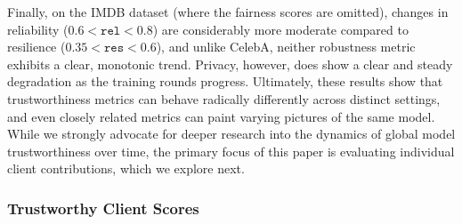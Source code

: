 \documentclass[acmsmall]{acmart}
\begin{document}
Finally, on the IMDB dataset (where the fairness scores are omitted), changes in reliability ($0.6 < \mathtt{rel} < 0.8$) are considerably more moderate compared to resilience ($0.35 < \mathtt{res} < 0.6$), and unlike CelebA, neither robustness metric exhibits a clear, monotonic trend. Privacy, however, does show a clear and steady degradation as the training rounds progress. Ultimately, these results show that trustworthiness metrics can behave radically differently across distinct settings, and even closely related metrics can paint varying pictures of the same model. While we strongly advocate for deeper research into the dynamics of global model trustworthiness over time, the primary focus of this paper is evaluating individual client contributions, which we explore next.

\subsubsection*{Trustworthy Client Scores}
\end{document}
